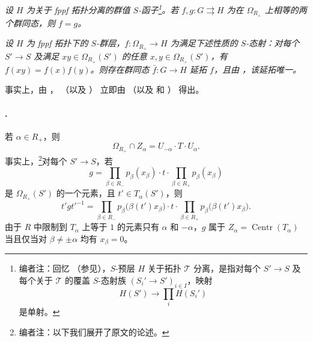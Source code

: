 \textit{\textup{} 设 \(H\) 为关于 fppf 拓扑分离的群值 \(S\)-函子\footnote{编者注：回忆 \textup{（参见）}，\(S\)-预层 \(H\) 关于拓扑 \(\mathcal T\) 分离，是指对每个 \(S'\to S\) 及每个关于 \(\mathcal T\) 的覆盖 \(S\)-态射族 \((S_i'\to S')_{i\in I}\)，映射
\[
  H(S')\longrightarrow\prod_i H(S_i')
\]
是单射。}。若 \(f,g:G\rightrightarrows H\) 为在 \(\Omega_{R_+}\) 上相等的两个群同态，则 \(f=g\)。}

\textit{\textup{} 设 \(H\) 为 fppf 拓扑下的 \(S\)-群层，\(f:\Omega_{R_+}\to H\) 为满足下述性质的 \(S\)-态射：对每个 \(S'\to S\) 及满足 \(xy\in\Omega_{R_+}(S')\) 的任意 \(x,y\in\Omega_{R_+}(S')\)，有 \(f(xy)=f(x)f(y)\)。则存在群同态 \(\bar f:G\to H\) 延拓 \(f\)，且由 \textup{}，该延拓唯一。}

事实上，由 ，\textup{} \textup{（以及 \textup{}）} 立即由 \textup{（以及  和 ）} 得出。

\paragraph{.}
若 \(\alpha\in R_+\)，则
\[
  \tag{\(\dagger\)}\label{sga3:xxii:subsection:4-1:equation:dagger}
  \Omega_{R_+}\cap Z_\alpha
  =
  U_{-\alpha}\mathbin{\cdot}T\mathbin{\cdot}U_\alpha.
\]
事实上，\footnote{编者注：以下我们展开了原文的论述。}对每个 \(S'\to S\)，若
\[
  g=
  \prod_{\beta\in R_-}p_\beta(x_\beta)
  \mathbin{\cdot}t\mathbin{\cdot}
  \prod_{\beta\in R_+}p_\beta(x_\beta)
\]
是 \(\Omega_{R_+}(S')\) 的一个元素，且 \(t'\in T_\alpha(S')\)，则
\[
  t'gt'^{-1}
  =
  \prod_{\beta\in R_-}p_\beta\bigl(\beta(t')x_\beta\bigr)
  \mathbin{\cdot}t\mathbin{\cdot}
  \prod_{\beta\in R_+}p_\beta\bigl(\beta(t')x_\beta\bigr).
\]
由于 \(R\) 中限制到 \(T_\alpha\) 上等于 \(1\) 的元素只有 \(\alpha\) 和 \(-\alpha\)，\(g\) 属于 \(Z_\alpha=\operatorname{Centr}(T_\alpha)\) 当且仅当对 \(\beta\ne\pm\alpha\) 均有 \(x_\beta=0\)。

